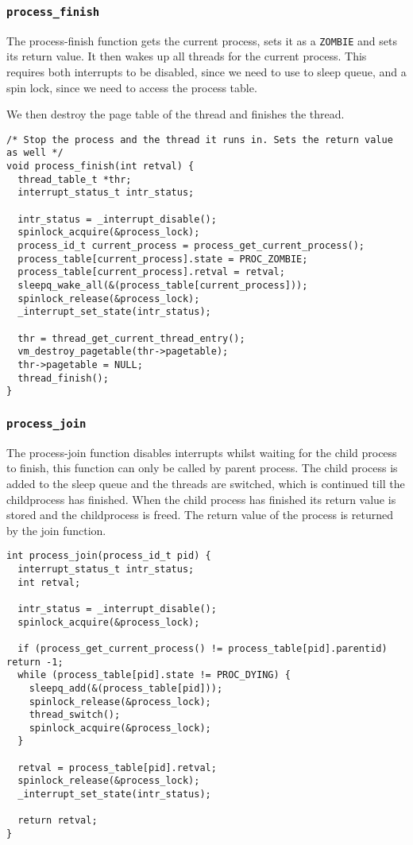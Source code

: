 \documentclass[a4paper,12pt]{article}
\begin{document}
\subsubsection{\texttt{process\_finish}}

The process-finish function gets the current process, sets it as a \texttt{ZOMBIE} and sets its return value. It then wakes up all threads for the current process. This requires both interrupts to be disabled, since we need to use to sleep queue, and a spin lock, since we need to access the process table.

We then destroy the page table of the thread and finishes the thread.

\begin{lstlisting}
/* Stop the process and the thread it runs in. Sets the return value as well */
void process_finish(int retval) {
  thread_table_t *thr;
  interrupt_status_t intr_status;
  
  intr_status = _interrupt_disable();
  spinlock_acquire(&process_lock);
  process_id_t current_process = process_get_current_process();
  process_table[current_process].state = PROC_ZOMBIE;
  process_table[current_process].retval = retval;
  sleepq_wake_all(&(process_table[current_process]));
  spinlock_release(&process_lock);
  _interrupt_set_state(intr_status);

  thr = thread_get_current_thread_entry();
  vm_destroy_pagetable(thr->pagetable);
  thr->pagetable = NULL;
  thread_finish();
}
\end{lstlisting}

\subsubsection{\texttt{process\_join}}
The process-join function disables interrupts whilst waiting for the child process to finish, this function can only be called by parent process. The child process is added to the sleep queue and the threads are switched, which is continued till the childprocess has finished. When the child process has finished its return value is stored and the childprocess is freed. The return value of the process is returned by the join function.

\begin{lstlisting}
int process_join(process_id_t pid) {
  interrupt_status_t intr_status;
  int retval;

  intr_status = _interrupt_disable();
  spinlock_acquire(&process_lock);

  if (process_get_current_process() != process_table[pid].parentid) return -1;
  while (process_table[pid].state != PROC_DYING) {
    sleepq_add(&(process_table[pid]));
    spinlock_release(&process_lock);
    thread_switch();
    spinlock_acquire(&process_lock);
  }

  retval = process_table[pid].retval;
  spinlock_release(&process_lock);
  _interrupt_set_state(intr_status);

  return retval;
} 
\end{lstlisting}
\end{document}

